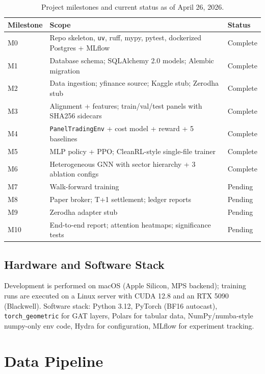\documentclass[11pt,a4paper]{article}
\begin{document}
\begin{table}[h]
\centering
\caption{Project milestones and current status as of April 26, 2026.}
\begin{tabularx}{\textwidth}{l X l}
\toprule
\textbf{Milestone} & \textbf{Scope} & \textbf{Status} \\
\midrule
M0 & Repo skeleton, \texttt{uv}, ruff, mypy, pytest, dockerized Postgres + MLflow & Complete \\
M1 & Database schema; SQLAlchemy 2.0 models; Alembic migration & Complete \\
M2 & Data ingestion; yfinance source; Kaggle stub; Zerodha stub & Complete \\
M3 & Alignment + features; train/val/test panels with SHA256 sidecars & Complete \\
M4 & \texttt{PanelTradingEnv} + cost model + reward + 5 baselines & Complete \\
M5 & MLP policy + PPO; CleanRL-style single-file trainer & Complete \\
M6 & Heterogeneous GNN with sector hierarchy + 3 ablation configs & Complete \\
M7 & Walk-forward training & Pending \\
M8 & Paper broker; T+1 settlement; ledger reports & Pending \\
M9 & Zerodha adapter stub & Pending \\
M10 & End-to-end report; attention heatmaps; significance tests & Pending \\
\bottomrule
\end{tabularx}
\end{table}

\subsection{Hardware and Software Stack}

Development is performed on macOS (Apple Silicon, MPS backend); training runs are
executed on a Linux server with CUDA 12.8 and an RTX 5090 (Blackwell). Software stack:
Python 3.12, PyTorch (BF16 autocast), \texttt{torch\_geometric} for GAT layers,
Polars for tabular data, NumPy/numba-style numpy-only env code, Hydra for
configuration, MLflow for experiment tracking.

\section{Data Pipeline}
\end{document}
